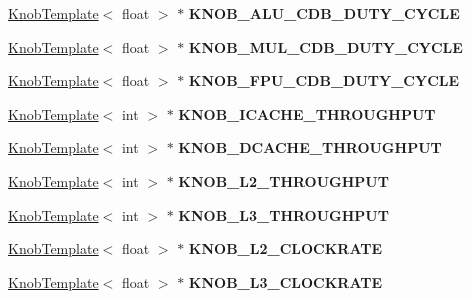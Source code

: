 \begin{DoxyCompactItemize}
\item 
\hypertarget{classall__knobs__c_a4139f5fac8ead24a4fa9093585f5f100}{
\hyperlink{classKnobTemplate}{KnobTemplate}$<$ float $>$ $\ast$ {\bfseries KNOB\_\-ALU\_\-CDB\_\-DUTY\_\-CYCLE}}
\label{classall__knobs__c_a4139f5fac8ead24a4fa9093585f5f100}

\item 
\hypertarget{classall__knobs__c_aaafe03429d53a88f4e7408b41e6a7551}{
\hyperlink{classKnobTemplate}{KnobTemplate}$<$ float $>$ $\ast$ {\bfseries KNOB\_\-MUL\_\-CDB\_\-DUTY\_\-CYCLE}}
\label{classall__knobs__c_aaafe03429d53a88f4e7408b41e6a7551}

\item 
\hypertarget{classall__knobs__c_a56975015f1e436356a78180b510ca22a}{
\hyperlink{classKnobTemplate}{KnobTemplate}$<$ float $>$ $\ast$ {\bfseries KNOB\_\-FPU\_\-CDB\_\-DUTY\_\-CYCLE}}
\label{classall__knobs__c_a56975015f1e436356a78180b510ca22a}

\item 
\hypertarget{classall__knobs__c_a123bec223fe22557883faff22862cd4f}{
\hyperlink{classKnobTemplate}{KnobTemplate}$<$ int $>$ $\ast$ {\bfseries KNOB\_\-ICACHE\_\-THROUGHPUT}}
\label{classall__knobs__c_a123bec223fe22557883faff22862cd4f}

\item 
\hypertarget{classall__knobs__c_a30a5a98e190ed8fab244ebf21ab4162f}{
\hyperlink{classKnobTemplate}{KnobTemplate}$<$ int $>$ $\ast$ {\bfseries KNOB\_\-DCACHE\_\-THROUGHPUT}}
\label{classall__knobs__c_a30a5a98e190ed8fab244ebf21ab4162f}

\item 
\hypertarget{classall__knobs__c_a05760d9c16e4d5ea1ffa545df79f0331}{
\hyperlink{classKnobTemplate}{KnobTemplate}$<$ int $>$ $\ast$ {\bfseries KNOB\_\-L2\_\-THROUGHPUT}}
\label{classall__knobs__c_a05760d9c16e4d5ea1ffa545df79f0331}

\item 
\hypertarget{classall__knobs__c_aff4f7a7428d8ee86d7458407dd961b41}{
\hyperlink{classKnobTemplate}{KnobTemplate}$<$ int $>$ $\ast$ {\bfseries KNOB\_\-L3\_\-THROUGHPUT}}
\label{classall__knobs__c_aff4f7a7428d8ee86d7458407dd961b41}

\item 
\hypertarget{classall__knobs__c_a9c9691207c2abc034d25cc22beaa7488}{
\hyperlink{classKnobTemplate}{KnobTemplate}$<$ float $>$ $\ast$ {\bfseries KNOB\_\-L2\_\-CLOCKRATE}}
\label{classall__knobs__c_a9c9691207c2abc034d25cc22beaa7488}

\item 
\hypertarget{classall__knobs__c_a1455603bbb30e4a3ad61939d40610097}{
\hyperlink{classKnobTemplate}{KnobTemplate}$<$ float $>$ $\ast$ {\bfseries KNOB\_\-L3\_\-CLOCKRATE}}
\label{classall__knobs__c_a1455603bbb30e4a3ad61939d40610097}


\end{DoxyCompactItemize}
